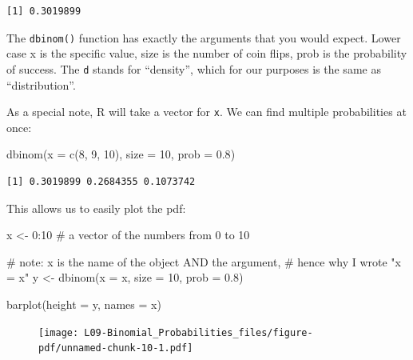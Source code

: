 \documentclass[
  letterpaper,
  DIV=11,
  numbers=noendperiod]{scrreprt}
\newenvironment{Shaded}{\begin{snugshade}}{\end{snugshade}}
\newcommand{\AttributeTok}[1]{\textcolor[rgb]{0.40,0.45,0.13}{#1}}
\newcommand{\CommentTok}[1]{\textcolor[rgb]{0.37,0.37,0.37}{#1}}
\newcommand{\DecValTok}[1]{\textcolor[rgb]{0.68,0.00,0.00}{#1}}
\newcommand{\FloatTok}[1]{\textcolor[rgb]{0.68,0.00,0.00}{#1}}
\newcommand{\FunctionTok}[1]{\textcolor[rgb]{0.28,0.35,0.67}{#1}}
\newcommand{\NormalTok}[1]{\textcolor[rgb]{0.00,0.23,0.31}{#1}}
\newcommand{\OtherTok}[1]{\textcolor[rgb]{0.00,0.23,0.31}{#1}}
\newcommand{\SpecialCharTok}[1]{\textcolor[rgb]{0.37,0.37,0.37}{#1}}
\begin{document}
\begin{verbatim}
[1] 0.3019899
\end{verbatim}

The \texttt{dbinom()} function has exactly the arguments that you would
expect. Lower case x is the specific value, size is the number of coin
flips, prob is the probability of success. The \texttt{d} stands for
``density'', which for our purposes is the same as ``distribution''.

As a special note, R will take a vector for \texttt{x}. We can find
multiple probabilities at once:

\begin{Shaded}
\begin{Highlighting}[]
\FunctionTok{dbinom}\NormalTok{(}\AttributeTok{x =} \FunctionTok{c}\NormalTok{(}\DecValTok{8}\NormalTok{, }\DecValTok{9}\NormalTok{, }\DecValTok{10}\NormalTok{), }\AttributeTok{size =} \DecValTok{10}\NormalTok{, }\AttributeTok{prob =} \FloatTok{0.8}\NormalTok{)}
\end{Highlighting}
\end{Shaded}

\begin{verbatim}
[1] 0.3019899 0.2684355 0.1073742
\end{verbatim}

This allows us to easily plot the pdf:

\begin{Shaded}
\begin{Highlighting}[]
\NormalTok{x }\OtherTok{\textless{}{-}} \DecValTok{0}\SpecialCharTok{:}\DecValTok{10} \CommentTok{\# a vector of the numbers from 0 to 10}

\CommentTok{\# note: x is the name of the object AND the argument,}
\CommentTok{\# hence why I wrote "x = x"}
\NormalTok{y }\OtherTok{\textless{}{-}} \FunctionTok{dbinom}\NormalTok{(}\AttributeTok{x =}\NormalTok{ x, }\AttributeTok{size =} \DecValTok{10}\NormalTok{, }\AttributeTok{prob =} \FloatTok{0.8}\NormalTok{)}

\FunctionTok{barplot}\NormalTok{(}\AttributeTok{height =}\NormalTok{ y, }\AttributeTok{names =}\NormalTok{ x)}
\end{Highlighting}
\end{Shaded}

\begin{figure}[H]

{\centering \texttt{[image: L09-Binomial\_Probabilities\_files/figure-pdf/unnamed-chunk-10-1.pdf]}

}

\end{figure}
\end{document}
